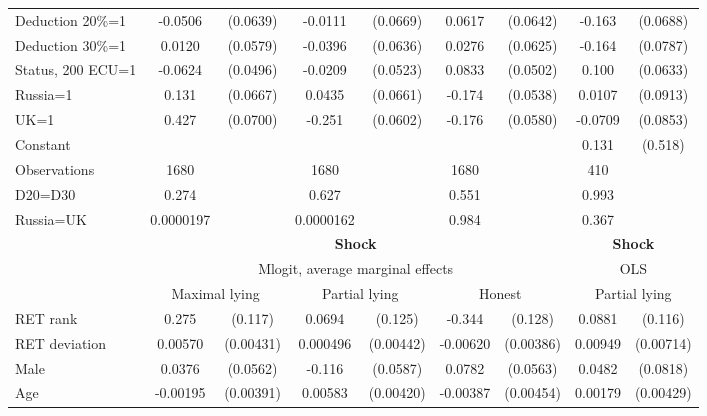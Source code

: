 \begin{tabular}{l|cccccc|cc}
Deduction 20\%=1&  -0.0506         & (0.0639)&  -0.0111         & (0.0669)&   0.0617         & (0.0642)&   -0.163\sym{**} & (0.0688)\\
Deduction 30\%=1&   0.0120         & (0.0579)&  -0.0396         & (0.0636)&   0.0276         & (0.0625)&   -0.164\sym{**} & (0.0787)\\
Status, 200 ECU=1&  -0.0624         & (0.0496)&  -0.0209         & (0.0523)&   0.0833\sym{*}  & (0.0502)&    0.100         & (0.0633)\\
Russia=1        &    0.131\sym{**} & (0.0667)&   0.0435         & (0.0661)&   -0.174\sym{***}& (0.0538)&   0.0107         & (0.0913)\\
UK=1            &    0.427\sym{***}& (0.0700)&   -0.251\sym{***}& (0.0602)&   -0.176\sym{***}& (0.0580)&  -0.0709         & (0.0853)\\
Constant        &                  &         &                  &         &                  &         &    0.131         &  (0.518)\\
\hline
Observations    &     1680         &         &     1680         &         &     1680         &         &      410         &         \\
D20=D30         &    0.274         &         &    0.627         &         &    0.551         &         &    0.993         &         \\
Russia=UK       &0.0000197         &         &0.0000162         &         &    0.984         &         &    0.367         &         \\
\hline\hline
&\multicolumn{6}{c|}{\bf Shock}&\multicolumn{2}{c}{\bf Shock}\\ &\multicolumn{6}{c|}{Mlogit, average marginal effects }&\multicolumn{2}{c}{OLS}\\
                &\multicolumn{2}{c}{Maximal lying}&\multicolumn{2}{c}{Partial lying}&\multicolumn{2}{c}{Honest}  &\multicolumn{2}{c}{Partial lying}\\
\hline
RET rank        &    0.275\sym{**} &  (0.117)&   0.0694         &  (0.125)&   -0.344\sym{***}&  (0.128)&   0.0881         &  (0.116)\\
RET deviation   &  0.00570         &(0.00431)& 0.000496         &(0.00442)& -0.00620         &(0.00386)&  0.00949         &(0.00714)\\
Male            &   0.0376         & (0.0562)&   -0.116\sym{**} & (0.0587)&   0.0782         & (0.0563)&   0.0482         & (0.0818)\\
Age             & -0.00195         &(0.00391)&  0.00583         &(0.00420)& -0.00387         &(0.00454)&  0.00179         &(0.00429)\\

\end{tabular}
